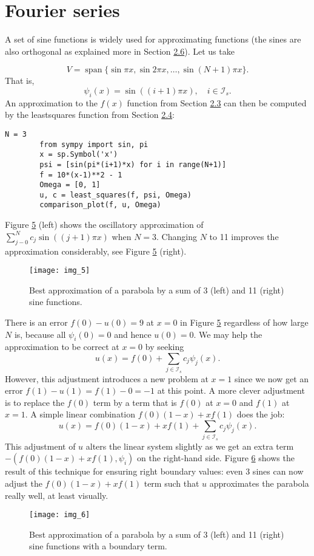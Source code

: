 \documentclass[../main.tex]{subfiles}
\begin{document}
	\section[Fourier series]{Fourier series}
	\label{sec:sec_2_7}
	\noindent A set of sine functions is widely used for approximating functions (the sines are
	also orthogonal as explained more in Section \hyperref[sec:sec_2_6]{2.6}). Let us take
	
	$$
	V=\operatorname{span}\{\sin \pi x, \sin 2 \pi x, \ldots, \sin (N+1) \pi x\}.
	$$
	That is,
	$$
	\psi_{i}(x)=\sin ((i+1) \pi x), \quad i \in \mathcal{I}_{s} .
	$$
	An approximation to the $f(x)$ function from Section \hyperref[sec:sec_2_3]{2.3} can then be computed by the least\textunderscore squares function from Section \hyperref[sec:sec_2_4]{2.4}:
	\begin{lstlisting}[numbers=none]
		N = 3
		from sympy import sin, pi
		x = sp.Symbol('x')
		psi = [sin(pi*(i+1)*x) for i in range(N+1)]
		f = 10*(x-1)**2 - 1
		Omega = [0, 1]
		u, c = least_squares(f, psi, Omega)
		comparison_plot(f, u, Omega)
	\end{lstlisting}
	Figure \hyperref[fig:img_5]{5} (left) shows the oscillatory approximation of $\sum_{j-0}^{N} c_{j} \sin ((j+1) \pi x)$ when $N=3$. Changing $N$ to 11 improves the approximation considerably, see Figure \hyperref[fig:img_5]{5} (right).
	\begin{figure}[H]
		\centering
		\texttt{[image: img\_5]}
		\caption{Best approximation of a parabola by a sum of 3 (left) and 11 (right) sine functions.}
		\label{fig:img_5}
	\end{figure}
	
	There is an error $f(0)-u(0)=9$ at $x=0$ in Figure \hyperref[fig:img_5]{5} regardless of how large $N$ is, because all $\psi_{i}(0)=0$ and hence $u(0)=0$. We may help the approximation to be correct at $x=0$ by seeking
	\begin{equation}\label{eqa39}
		u(x)=f(0)+\sum_{j \in \mathcal{I}_{s}} c_{j} \psi_{j}(x).
	\end{equation}
	However, this adjustment introduces a new problem at $x=1$ since we now get an error $f(1)-u(1)=f(1)-0=-1$ at this point. A more clever adjustment is to replace the $f(0)$ term by a term that is $f(0)$ at $x=0$ and $f(1)$ at $x=1$. A simple linear combination $f(0)(1-x)+x f(1)$ does the job:
	\begin{equation}\label{eqa40}
		u(x)=f(0)(1-x)+x f(1)+\sum_{j \in \mathcal{I}_{s}} c_{j} \psi_{j}(x).
	\end{equation}
	\noindent This adjustment of $u$ alters the linear system slightly as we get an extra term $-\left(f(0)(1-x)+x f(1), \psi_{i}\right)$ on the right-hand side. Figure \hyperref[fig:img_6]{6} shows the result of this technique for ensuring right boundary values: even 3 sines can now adjust the $f(0)(1-x)+x f(1)$ term such that $u$ approximates the parabola really well, at least visually.
	\begin{figure}[H]
		\centering
		\texttt{[image: img\_6]}
		\caption{Best approximation of a parabola by a sum of 3 (left) and 11 (right)
			sine functions with a boundary term.}
		\label{fig:img_6}
	\end{figure}
\end{document}
